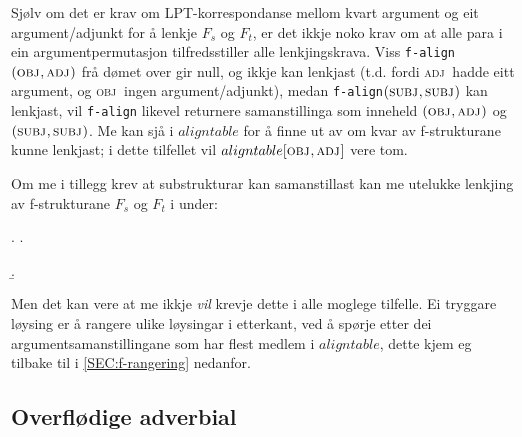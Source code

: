 \documentclass[11pt,a4paper,oneside,draft]{book}
\newcommand{\F}[2]{\textsc{#1}\ensuremath{_{#2}}}
\newcommand{\OBJ}{\F{obj}{}}
\newcommand{\OBJs}{\F{obj~}{}}
\newcommand{\ADJ}{\F{adj}{}}
\newcommand{\ADJs}{\F{adj~}{}}
\newcommand{\SUBJ}{\F{subj}{}}
\begin{document}
Sjølv om det er krav om LPT-korrespondanse mellom kvart argument og
eit argument/adjunkt for å lenkje $F_s$ og $F_t$, er det ikkje noko
krav om at alle para i ein argumentpermutasjon tilfredsstiller alle
lenkjingskrava. Viss \texttt{f-align}$(\OBJ,\ADJ)$ frå dømet over gir
null, og ikkje kan lenkjast (t.d. fordi \ADJs hadde eitt argument, og
\OBJs ingen argument/adjunkt), medan \texttt{f-align}$(\SUBJ,\SUBJ)$
kan lenkjast, vil \texttt{f-align} likevel returnere samanstillinga som
inneheld $(\OBJ,\ADJ)$ og $(\SUBJ,\SUBJ)$. Me kan sjå i $aligntable$
for å finne ut av om kvar av f-strukturane kunne lenkjast; i dette
tilfellet vil $aligntable[\OBJ,\ADJ]$ vere tom.


Om me i tillegg krev at substrukturar kan samanstillast kan me
utelukke lenkjing av f-strukturane $F_s$ og $F_t$ i \Next under:

{\avmoptions{}

\ex. \a.  \begin{avm}    \end{avm}
  \b.\begin{avm}  \end{avm}

}

Men det kan vere at me ikkje \emph{vil} krevje dette i alle moglege
tilfelle. Ei tryggare løysing er å rangere ulike løysingar i
etterkant, ved å spørje etter dei argumentsamanstillingane som har
flest medlem i $aligntable$, dette kjem eg tilbake til i
\ref{SEC:f-rangering} nedanfor.
\subsection{Overflødige adverbial}
\label{sec-4.1.1}

   \label{SEC:impl-adjalign}
\end{document}
